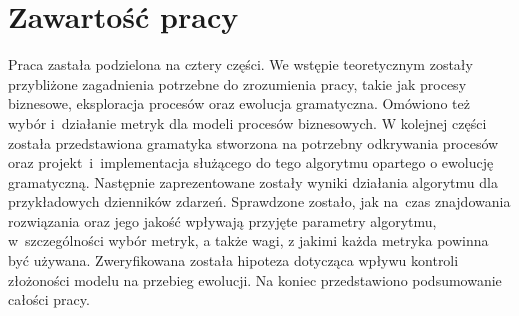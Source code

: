 \section{Zawartość pracy}
\label{sec:zawartoscPracy}

Praca zastała podzielona na cztery części. We wstępie teoretycznym zostały przybliżone zagadnienia potrzebne do zrozumienia pracy, takie jak procesy biznesowe, eksploracja procesów oraz ewolucja gramatyczna. Omówiono też wybór i~działanie metryk dla modeli procesów biznesowych. W kolejnej części została przedstawiona gramatyka stworzona na potrzebny odkrywania procesów oraz projekt~i~implementacja służącego do tego algorytmu opartego o ewolucję gramatyczną. Następnie zaprezentowane zostały wyniki działania algorytmu dla przykładowych dzienników zdarzeń. Sprawdzone zostało, jak na~czas znajdowania rozwiązania oraz jego jakość wpływają przyjęte parametry algorytmu, w~szczególności wybór metryk, a także wagi, z jakimi każda metryka powinna być używana. Zweryfikowana została hipoteza dotycząca wpływu kontroli złożoności modelu na przebieg ewolucji. Na koniec przedstawiono podsumowanie całości pracy. 
